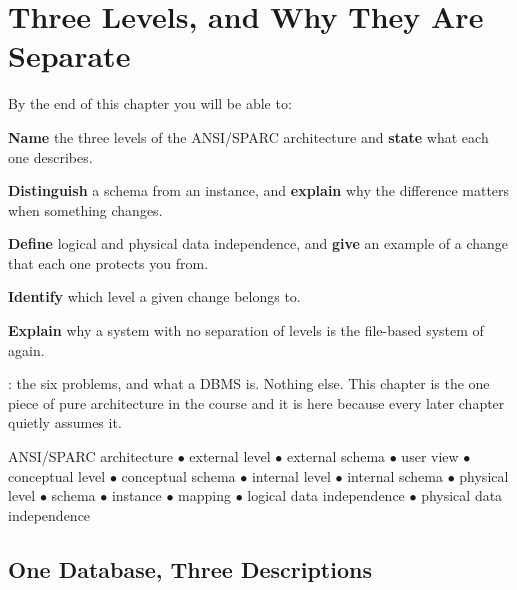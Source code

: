 \chapter{Three Levels, and Why They Are Separate}\label{ch:architecture}

\begin{outcomes}
By the end of this chapter you will be able to:
\begin{tight}
  \item \textbf{Name} the three levels of the ANSI/SPARC architecture and
        \textbf{state} what each one describes.
  \item \textbf{Distinguish} a schema from an instance, and \textbf{explain}
        why the difference matters when something changes.
  \item \textbf{Define} logical and physical data independence, and
        \textbf{give} an example of a change that each one protects you from.
  \item \textbf{Identify} which level a given change belongs to.
  \item \textbf{Explain} why a system with no separation of levels is the
        file-based system of  again.
\end{tight}
\end{outcomes}

\begin{prereq}
: the six problems, and what a DBMS is. Nothing else. This
chapter is the one piece of pure architecture in the course and it is here
because every later chapter quietly assumes it.
\end{prereq}

\begin{keyterms}
ANSI/SPARC architecture $\bullet$ external level $\bullet$ external schema
$\bullet$ user view $\bullet$ conceptual level $\bullet$ conceptual schema
$\bullet$ internal level $\bullet$ internal schema $\bullet$ physical level
$\bullet$ schema $\bullet$ instance $\bullet$ mapping $\bullet$ logical data
independence $\bullet$ physical data independence
\end{keyterms}

\section{One Database, Three Descriptions}

